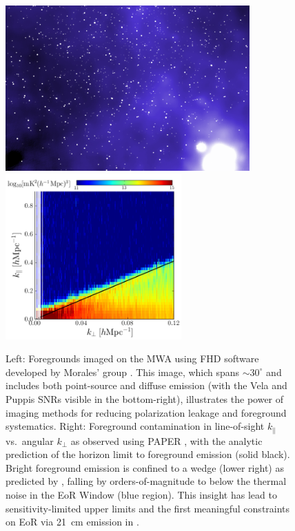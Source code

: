 \documentclass[preprint]{aastex}
\def\kperp{k_{\bot}}
\def\kpar{k_{\|}}
\begin{document}
\begin{figure}[t] \centering
\includegraphics[height=2.5in]{plots/MWApretty_crop.png} 
~ %
\includegraphics[height=2.5in]{plots/wedge_tall_wide.png} \caption{\small Left:
Foregrounds imaged on the MWA using FHD software developed by Morales' group
\citep{sullivan_et_al2012_trunc}.  This image, which spans $\sim$$30^{\circ}$ and
includes both point-source and diffuse emission (with the Vela and Puppis SNRs visible in the
bottom-right), illustrates the power of imaging methods for reducing
polarization leakage and foreground systematics.  
Right: Foreground contamination in line-of-sight $\kpar$ vs.\ angular $\kperp$
as observed using PAPER \citep{pober_et_al2013}, with
the analytic prediction of the horizon limit to foreground emission (solid black).
Bright foreground emission is
confined to a wedge (lower right) as predicted by
\citep{morales_et_al2012,parsons_et_al2012b,vedantham_2012,Datta_2010}, falling
by orders-of-magnitude to below the thermal noise in the EoR Window (blue
region). This insight has lead to sensitivity-limited upper limits and the
first meaningful constraints on EoR via 21~cm emission in
\citet{parsons_et_al2013}.
}\label{fig:twoFGViews} \end{figure}
\end{document}
